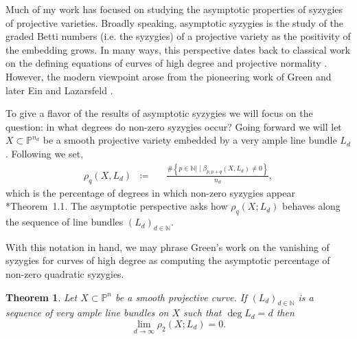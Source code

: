 \documentclass[11pt,reqno]{amsart}
\newtheorem{theorem}[lemma]{Theorem}
\theoremstyle{remark}
\newcommand{\N}{\mathbb{N}}
\renewcommand{\P}{\mathbb{P}}
\begin{document}
Much of my work has focused on studying the asymptotic properties of syzygies of projective varieties. Broadly speaking, asymptotic syzygies is the study of the graded Betti numbers (i.e. the syzygies) of a projective variety as the positivity of the embedding grows. In many ways, this perspective dates back to classical work on the defining equations of curves of high degree and projective normality \cite{mumford66, mumford70}. However, the modern viewpoint arose from the pioneering work of Green \cite{green84-I, green84-II} and later Ein and Lazarsfeld \cite{einLazarsfeld12}. 

To give a flavor of the results of asymptotic syzygies we will focus on the question: in what degrees do non-zero syzygies occur? Going forward we will let $X\subset \P^{n_{d}}$ be a smooth projective variety embedded by a very ample line bundle $L_{d}$. Following \cite{ermanYang18} we set, 
\begin{align*}
\rho_q\left(X,L_{d}\right)\;\;\coloneqq&\ \;\; \frac{\#\left\{p\in\N |\; \big| \; \beta_{p,p+q}\left(X,L_{d}\right)\neq0\right\}}{n_{d}},
\end{align*}
which is the percentage of degrees in which non-zero syzygies appear \cite{eisenbud05}*{Theorem~1.1}. The asymptotic perspective asks how $\rho_{q}(X;L_{d})$ behaves along the sequence of line bundles $(L_{d})_{d\in \N}$. 

With this notation in hand, we may phrase Green's work on the vanishing of syzygies for curves of high degree as computing the asymptotic percentage of non-zero quadratic syzygies. 

\begin{theorem}\cite{green84-I}
Let $X\subset \P^n$ be a smooth projective curve. If $(L_{d})_{d\in\N}$ is a sequence of very ample line bundles on $X$ such that $\deg L_{d} = d$ then 
\[
\lim_{d\to \infty} \rho_{2}\left(X;L_{d}\right) = 0.
\]
\end{theorem}
\end{document}
